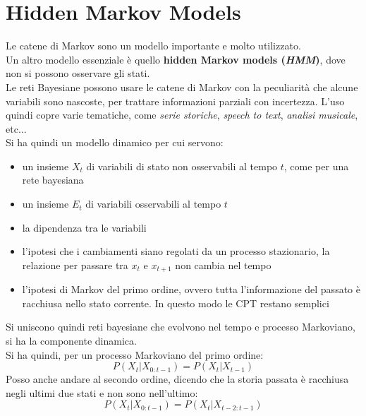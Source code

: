 \message{ !name(modprob.tex)}\documentclass[a4paper,12pt, oneside]{book}
\begin{document}
\section{Hidden Markov Models}
Le catene di Markov sono un modello importante e molto utilizzato.\\
Un altro modello essenziale è quello \textbf{hidden Markov models
  (\textit{HMM})}, dove non si possono osservare gli stati.\\
Le reti Bayesiane possono usare le catene di Markov con la peculiarità che
alcune variabili sono nascoste, per trattare informazioni parziali con
incertezza. L'uso quindi copre varie tematiche, come \textit{serie storiche},
\textit{speech to text}, \textit{analisi musicale}, etc$\ldots$ \\
Si ha quindi un modello dinamico per cui servono:
\begin{itemize}
  \item un insieme $X_t$ di variabili di stato non osservabili al tempo $t$,
  come per una rete bayesiana
  \item un insieme $E_t$ di variabili osservabili al tempo $t$
  \item la dipendenza tra le variabili
  \item l'ipotesi che i cambiamenti siano regolati da un processo stazionario,
  la relazione per passare tra $x_t$ e $x_{t+1}$ non cambia nel tempo
  \item l'ipotesi di Markov del primo ordine, ovvero tutta l'informazione del
  passato è racchiusa nello stato corrente. In questo modo le CPT restano
  semplici 
\end{itemize}
Si uniscono quindi reti bayesiane che evolvono nel tempo e processo
Markoviano, si ha la componente dinamica. \\
Si ha quindi, per un processo Markoviano del primo ordine:
\[P(X_t|X_{0:t-1})=P(X_t|X_{t-1})\]
Posso anche andare al secondo ordine, dicendo che la storia passata è racchiusa
negli ultimi due stati e non sono nell'ultimo:
\[P(X_t|X_{0:t-1})=P(X_t|X_{t-2:t-1})\]
\end{document}
